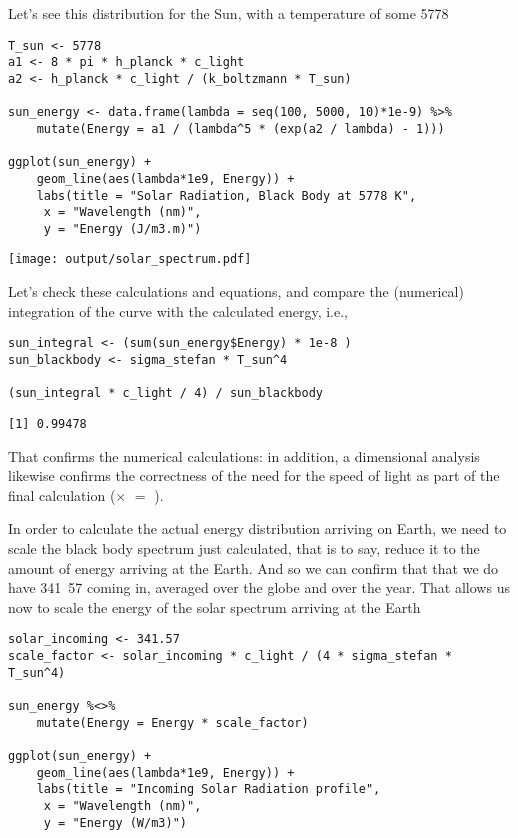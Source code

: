 \documentclass[10pt,a4paper,titlepage]{article}
\begin{document}
Let's see this distribution for the Sun, with a temperature of some
\unit{5778}{\kelvin} 
\begin{lstlisting}
T_sun <- 5778
a1 <- 8 * pi * h_planck * c_light
a2 <- h_planck * c_light / (k_boltzmann * T_sun)

sun_energy <- data.frame(lambda = seq(100, 5000, 10)*1e-9) %>%
    mutate(Energy = a1 / (lambda^5 * (exp(a2 / lambda) - 1)))

ggplot(sun_energy) +
    geom_line(aes(lambda*1e9, Energy)) +
    labs(title = "Solar Radiation, Black Body at 5778 K",
	 x = "Wavelength (nm)",
	 y = "Energy (J/m3.m)")
\end{lstlisting}

\texttt{[image: output/solar\_spectrum.pdf]}

Let's check these calculations and equations, and compare the
(numerical) integration of the curve with the calculated energy, i.e.,
\begin{lstlisting}
sun_integral <- (sum(sun_energy$Energy) * 1e-8 )
sun_blackbody <- sigma_stefan * T_sun^4

(sun_integral * c_light / 4) / sun_blackbody
\end{lstlisting}

\begin{verbatim}
[1] 0.99478
\end{verbatim}

That confirms the numerical calculations: in addition, a dimensional
analysis likewise confirms the correctness of the need for the speed
of light as part of the final calculation
(\joule\per\metre\cubed $\times$ \metre\per\second $=$
\watt\per\metre\squared).

In order to calculate the actual energy distribution arriving on
Earth, we need to scale the black body spectrum just calculated, that
is to say, reduce it to the amount of energy arriving at the
Earth. 
And so we can confirm that that we do have
\unit{341.57}{\watt\per\metre\squared} coming in, averaged over the
globe and over the year. That allows us now to scale the energy of the
solar spectrum arriving at the Earth
\begin{lstlisting}
solar_incoming <- 341.57
scale_factor <- solar_incoming * c_light / (4 * sigma_stefan * T_sun^4)

sun_energy %<>%
    mutate(Energy = Energy * scale_factor)

ggplot(sun_energy) +
    geom_line(aes(lambda*1e9, Energy)) +
    labs(title = "Incoming Solar Radiation profile",
	 x = "Wavelength (nm)",
	 y = "Energy (W/m3)")
\end{lstlisting}
\end{document}
